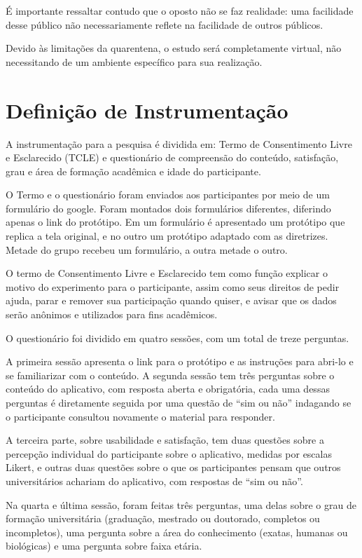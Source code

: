 \documentclass[12pt]{article}
\begin{document}
É importante ressaltar contudo que o oposto não se faz realidade: uma facilidade desse público não necessariamente reflete na facilidade de outros públicos.

Devido às limitações da quarentena, o estudo será completamente virtual, não necessitando de um ambiente específico para sua realização.

\section{Definição de Instrumentação}

A instrumentação para a pesquisa é dividida em: Termo de Consentimento Livre e Esclarecido (TCLE) e questionário de compreensão do conteúdo, satisfação, grau e área de formação acadêmica e idade do participante.

O Termo e o questionário foram enviados aos participantes por meio de um formulário do google. Foram montados dois formulários diferentes, diferindo apenas o link do protótipo. Em um formulário é apresentado um protótipo que replica a tela original, e no outro um protótipo adaptado com as diretrizes. Metade do grupo recebeu um formulário, a outra metade o outro.

O termo de Consentimento Livre e Esclarecido tem como função explicar o motivo do experimento para o participante, assim como seus direitos de pedir ajuda, parar e remover sua participação quando quiser, e avisar que os dados serão anônimos e utilizados para fins acadêmicos.

O questionário foi dividido em quatro sessões, com um total de treze perguntas.

A primeira sessão apresenta o link para o protótipo e as instruções para abri-lo e se familiarizar com o conteúdo. A segunda sessão tem três perguntas sobre o conteúdo do aplicativo, com resposta aberta e obrigatória, cada uma dessas perguntas é diretamente seguida por uma questão de ``sim ou não'' indagando se o participante consultou novamente o material para responder. 

A terceira parte, sobre usabilidade e satisfação, tem duas questões sobre a percepção individual do participante sobre o aplicativo, medidas por escalas Likert, e outras duas questões sobre o que os participantes pensam que outros universitários achariam do aplicativo, com respostas de ``sim ou não''. 

Na quarta e última sessão, foram feitas três perguntas, uma delas sobre o grau de formação universitária (graduação, mestrado ou doutorado, completos ou incompletos), uma pergunta sobre a área do conhecimento (exatas, humanas ou biológicas) e uma pergunta sobre faixa etária.
\end{document}
